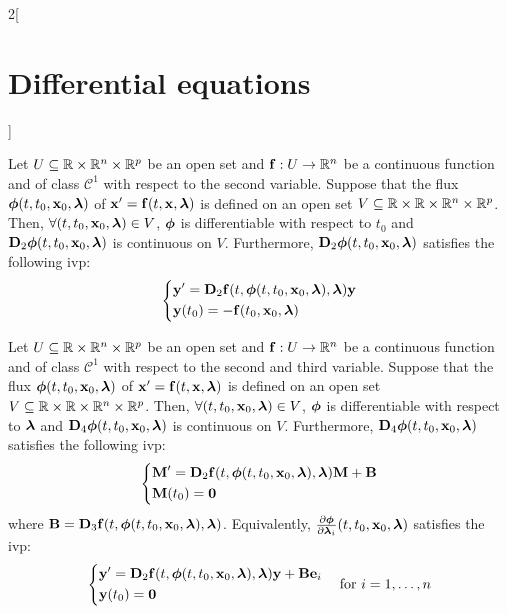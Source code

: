 \documentclass[../../../main.tex]{subfiles}
\begin{document}
\begin{multicols}{2}[\section{Differential equations}]
    \begin{theorem}[Dependence on $t_0$]
        Let $U\subseteq\RR\times\RR^n\times\RR^p$ be an open set and $\vf{f}:U\rightarrow\RR^n$ be a continuous function and of class $\mathcal{C}^1$ with respect to the second variable. Suppose that the flux $\vf{\phi}(t,t_0,\vf{x}_0,\vf{\lambda})$ of $\vf{x}'=\vf{f}(t,\vf{x},\vf{\lambda})$ is defined on an open set $V\subseteq\RR\times\RR\times\RR^n\times\RR^p$. Then, $\forall (t,t_0,\vf{x}_0,\vf{\lambda})\in V$, $\vf{\phi}$ is differentiable with respect to $t_0$ and $\vf{D}_2\vf{\phi}(t,t_0,\vf{x}_0,\vf{\lambda})$ is continuous on $V$. Furthermore, $\vf{D}_2\vf{\phi}(t,t_0,\vf{x}_0,\vf{\lambda})$ satisfies the following ivp:
        \begin{equation*}
            \left\{
            \begin{aligned}
                 & \vf{y}'      =\vf{D}_2\vf{f}(t,\vf{\phi}(t,t_0,\vf{x}_0,\vf{\lambda}),\vf{\lambda})\vf{y} \\
                 & \vf{y}(t_0)  = -\vf{f}(t_0,\vf{x}_0,\vf{\lambda})
            \end{aligned}
            \right.
        \end{equation*}
    \end{theorem}
    \begin{theorem}
        Let $U\subseteq\RR\times\RR^n\times\RR^p$ be an open set and $\vf{f}:U\rightarrow\RR^n$ be a continuous function and of class $\mathcal{C}^1$ with respect to the second and third variable. Suppose that the flux $\vf{\phi}(t,t_0,\vf{x}_0,\vf{\lambda})$ of $\vf{x}'=\vf{f}(t,\vf{x},\vf{\lambda})$ is defined on an open set $V\subseteq\RR\times\RR\times\RR^n\times\RR^p$. Then, $\forall (t,t_0,\vf{x}_0,\vf{\lambda})\in V$, $\vf{\phi}$ is differentiable with respect to $\vf{\lambda}$ and $\vf{D}_4\vf{\phi}(t,t_0,\vf{x}_0,\vf{\lambda})$ is continuous on $V$. Furthermore, $\vf{D}_4\vf{\phi}(t,t_0,\vf{x}_0,\vf{\lambda})$ satisfies the following ivp:
        \begin{equation*}
            \left\{
            \begin{aligned}
                 & \vf{M}'      =\vf{D}_2\vf{f}(t,\vf{\phi}(t,t_0,\vf{x}_0,\vf{\lambda}),\vf{\lambda})\vf{M}+ \vf{B} \\
                 & \vf{M}(t_0)  =\vf{0}
            \end{aligned}
            \right.
        \end{equation*}
        where $\vf{B}=\vf{D}_3\vf{f}(t,\vf{\phi}(t,t_0,\vf{x}_0,\vf{\lambda}),\vf{\lambda})$. Equivalently, $\frac{\partial\vf{\phi}}{\partial \vf{\lambda}_i}(t,t_0,\vf{x}_0,\vf{\lambda})$ satisfies the ivp:
        $$
            \left\{
            \begin{aligned}
                 & \vf{y}'      =\vf{D}_2\vf{f}(t,\vf{\phi}(t,t_0,\vf{x}_0,\vf{\lambda}),\vf{\lambda})\vf{y}+\vf{B}\vf{e}_i \\
                 & \vf{y}(t_0)  =\vf{0}
            \end{aligned}
            \right.\quad\text{for }i=1,\ldots,n
        $$
    \end{theorem}

\end{multicols}
\end{document}
